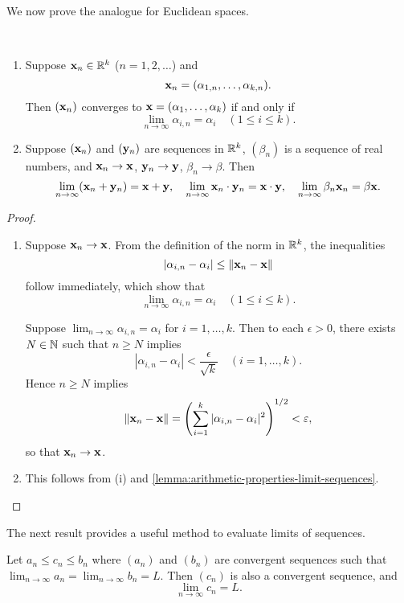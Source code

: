 We now prove the analogue for Euclidean spaces.

\begin{lemma} \
\begin{enumerate}[label=(\roman*)]
\item Suppose $\vb{x}_n\in\mathbb R^k$ ($n=1,2,\dots$) and
\[\vb{x}_n=(\alpha_{1,n},\dots,\alpha_{k,n}).\]
Then $(\vb{x}_n)$ converges to $\vb{x}=(\alpha_1,\dots,\alpha_k)$ if and only if
\[\lim_{n\to\infty}\alpha_{i,n}=\alpha_i\quad(1\le i\le k).\]

\item Suppose $(\vb{x}_n)$ and $(\vb{y}_n)$ are sequences in $\mathbb R^k$, $(\beta_n)$ is a sequence of real numbers, and $\vb{x}_n\to\vb{x}$, $\vb{y}_n\to\vb{y}$, $\beta_n\to\beta$. Then
\[\lim_{n\to\infty}(\vb{x}_n+\vb{y}_n)=\vb{x}+\vb{y},\quad\lim_{n\to\infty}\vb{x}_n\cdot\vb{y}_n=\vb{x}\cdot\vb{y},\quad\lim_{n\to\infty}\beta_n\vb{x}_n=\beta\vb{x}.\]
\end{enumerate}
\end{lemma}

\begin{proof} \
\begin{enumerate}[label=(\roman*)]
\item \forward Suppose $\vb{x}_n\to\vb{x}$. From the definition of the norm in $\mathbb R^k$, the inequalities 
\[|\alpha_{i,n}-\alpha_i|\le\norm{\vb{x}_n-\vb{x}}\]
follow immediately, which show that
\[\lim_{n\to\infty}\alpha_{i,n}=\alpha_i\quad(1\le i\le k).\]

\backward Suppose $\displaystyle\lim_{n\to\infty}\alpha_{i,n}=\alpha_i$ for $i=1,\dots,k$. Then to each $\epsilon>0$, there exists $N\in\mathbb N$ such that $n\ge N$ implies
\[|\alpha_{i,n}-\alpha_i|<\frac{\epsilon}{\sqrt{k}}\quad(i=1,\dots,k).\]
Hence $n\ge N$ implies
\[\norm{\vb{x}_n-\vb{x}}=\left(\sum_{i=1}^{k}|\alpha_{i,n}-\alpha_i|^2\right)^{1/2}<\varepsilon,\]
so that $\vb{x}_n\to\vb{x}$.

\item This follows from (i) and \ref{lemma:arithmetic-properties-limit-sequences}.
\end{enumerate}
\end{proof}

The next result provides a useful method to evaluate limits of sequences.

\begin{lemma}
Let $a_n\le c_n\le b_n$ where $(a_n)$ and $(b_n)$ are convergent sequences such that $\displaystyle\lim_{n\to\infty}a_n=\lim_{n\to\infty}b_n=L$. Then $(c_n)$ is also a convergent sequence, and
\[\lim_{n\to\infty}c_n=L.\]
\end{lemma}

